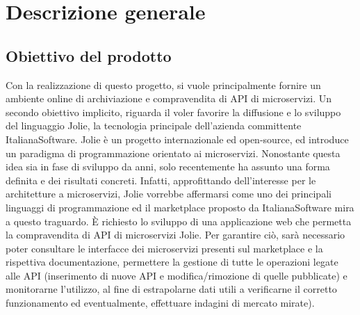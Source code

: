 \newpage
\section{Descrizione generale}
\subsection{Obiettivo del prodotto}
Con la realizzazione di questo progetto, si vuole principalmente fornire un ambiente online di archiviazione e compravendita di API di microservizi. Un secondo obiettivo implicito, riguarda il voler favorire la diffusione e lo sviluppo del linguaggio Jolie, la tecnologia principale dell'azienda committente ItalianaSoftware. Jolie è un progetto internazionale ed open-source, ed introduce un paradigma di programmazione orientato ai microservizi. Nonostante questa idea sia in fase di sviluppo da anni, solo recentemente ha assunto una forma definita e dei risultati concreti. Infatti, approfittando dell'interesse per le architetture a microservizi, Jolie vorrebbe affermarsi come uno dei principali linguaggi di programmazione ed il marketplace proposto da ItalianaSoftware mira a questo traguardo. \MakeUppercase{è} richiesto lo sviluppo di una applicazione web che permetta la compravendita di API di microservizi Jolie. Per garantire ciò, sarà necessario poter consultare le interfacce dei microservizi presenti sul marketplace e la rispettiva documentazione, permettere la gestione di tutte le operazioni legate alle API (inserimento di nuove API e modifica/rimozione di quelle pubblicate) e monitorarne l'utilizzo, al fine di estrapolarne dati utili a verificarne il corretto funzionamento ed eventualmente, effettuare indagini di mercato mirate).

